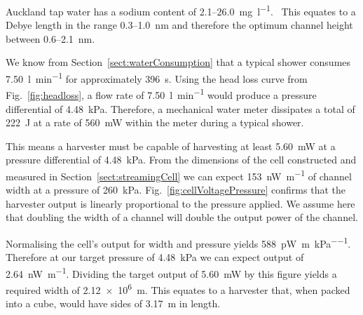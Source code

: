 \documentclass[10pt,final,journal]{IEEEtran}
\begin{document}
        Auckland tap water has a sodium content of 2.1--\SI{26.0}{\milli\gram\per\litre}.~\cite{WatercareNewZealand2012}
        This equates to a Debye length in the range 0.3--\SI{1.0}{\nano\metre} and therefore the optimum channel height between 0.6--\SI{2.1}{\nano\metre}.

        We know from Section~\ref{sect:waterConsumption} that a typical shower consumes \SI{7.50}{\litre\per\minute} for approximately \SI{396}{\second}.
        Using the head loss curve from Fig.~\ref{fig:headloss}, a flow rate of \SI{7.50}{\litre\per\minute} would produce a pressure differential of \SI{4.48}{\kilo\pascal}.
        Therefore, a mechanical water meter dissipates a total of \SI{222}{\joule} at a rate of \SI{560}{\milli\watt} within the meter during a typical shower.

        This means a harvester must be capable of harvesting at least \SI{5.60}{\milli\watt} at a pressure differential of \SI{4.48}{\kilo\pascal}.
        From the dimensions of the cell constructed and measured in Section~\ref{sect:streamingCell} we can expect \SI{153}{\nano\watt\per\metre} of channel width at a pressure of \SI{260}{\kilo\pascal}.
        Fig.~\ref{fig:cellVoltagePressure} confirms that the harvester output is linearly proportional to the pressure applied.
        We assume here that doubling the width of a channel will double the output power of the channel.

        Normalising the cell's output for width and pressure yields \SI{588}{\pico\watt\per\meter\per\kilo\pascal}.
        Therefore at our target pressure of \SI{4.48}{\kilo\pascal} we can expect output of \SI{2.64}{\nano\watt\per\meter}.
        Dividing the target output of \SI{5.60}{\milli\watt} by this figure yields a required width of \SI{2.12e6}{\meter}.
        This equates to a harvester that, when packed into a cube, would have sides of \SI{3.17}{\meter} in length.

\end{document}
